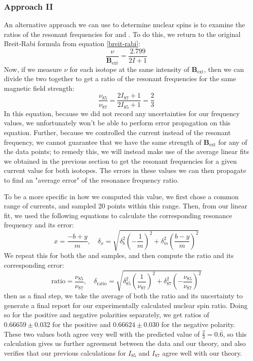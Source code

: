 \documentclass[10pt]{article}
\begin{document}
	\subsubsection{Approach II}
	\label{approach-2}
	An alternative approach we can use to determine nuclear spins is to examine the
	ratios of the resonant frequencies for  and . To do this,
	we return to the original Breit-Rabi formula from equation \ref{breit-rabi}:
	\[
		\frac{\nu}{\mathbf{B}_\text{ext}} = \frac{2.799}{2I + 1}
	\]
	Now, if we measure \( \nu \) for each isotope at the same intensity of \(
	\mathbf{B}_\text{ext} \), then we can divide the two together to get a ratio of
	the resonant frequencies for the same magnetic field strength:
	\[
		\frac{\nu_{85}}{\nu_{87}} = \frac{2 I_{87} + 1}{2 I_{85} + 1} = \frac{2}{3}
	\]
	In this equation, because we did not record any uncertainties for our frequency
	values, we unfortunately won't be able to perform error propagation on this
	equation. Further, because we controlled the current instead of the resonant
	frequency, we cannot guarantee that we have the same strength of \(
	\mathbf{B}_\text{ext} \) for any of the data points; to remedy this, we will
	instead make use of the average linear fits we obtained in the previous section 
	to get the resonant frequencies for a given current value for both isotopes. The
	errors in these values we can then propagate to find an "average error" of the
	resonance frequency ratio. 

	To be a more specific in how we computed this value, we first chose a common
	range of currents, and sampled 20 points within this range. Then, from our linear
	fit, we used the following equations to calculate the corresponding resonance
	frequency and its error:
	\[
		x = \frac{-b + y}{m}, \quad \delta_x = \sqrt{\delta_b^2 \left( -\frac{1}{m}
		\right)^2 + \delta_m^2 \left( \frac{b - y}{m} \right)^2}
	\]
	We repeat this for both the  and  samples, and then
	compute the ratio and its corresponding error:
	\[
		\text{ratio} = \frac{\nu_{85}}{\nu_{87}}, \quad 
		\delta_\text{ratio} = \sqrt{\delta_{85}^2 \left( \frac{1}{\nu_{87}} \right)^2
		+ \delta_{87}^2 \left( - \frac{\nu_{85}}{\nu_{87}} \right)^2}
	\]
	then as a final step, we take the average of both the ratio and its uncertainty
	to generate a final report for our experimentally calculated nuclear spin ratio.
	Doing so for the positive and negative polarities separately, we get ratios of
	\( 0.66659 \pm 0.032 \) for the positive and \( 0.66624 \pm 0.030 \) for the
	negative polarity. These two values both agree very well with the predicted value
	of \( \frac{2}{3} = 0.\overline 6 \), so this calculation gives us further
	agreement between the data and our theory, and also verifies that our previous
	calculations for \( I_{85} \) and \( I_{87} \) agree well with our theory.
	
\end{document}

